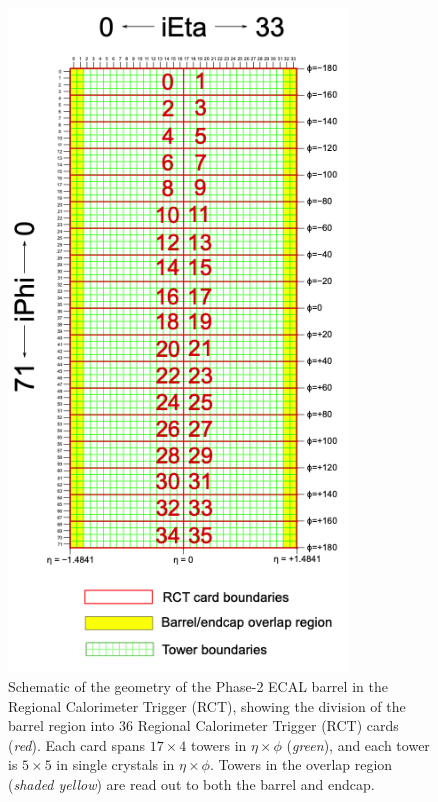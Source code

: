 \begin{figure}[ht]
    \centering
    \includegraphics[width=9cm]{figures/ch-4-phase2/phase-2-rct-cards-schematic.png}
    \caption{Schematic of the geometry of the Phase-2 ECAL barrel in the Regional Calorimeter Trigger (RCT), showing the division of the barrel region into 36 Regional Calorimeter Trigger (RCT) cards (\textit{red}). Each card spans $17 \times 4$ towers in $\eta \times \phi$ (\textit{green}), and each tower is $5\times 5$ in single crystals in $\eta \times \phi$. Towers in the overlap region (\textit{shaded yellow}) are read out to both the barrel and endcap.}
    \label{fig:phase-2-rct-cards-schematic}
\end{figure}

